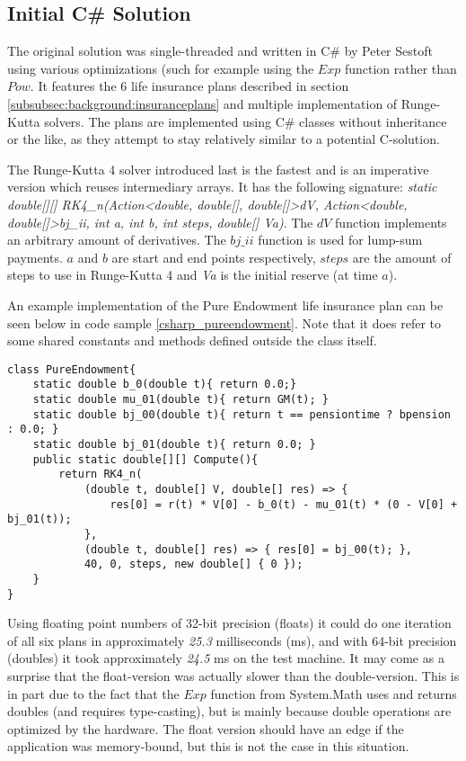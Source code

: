 \subsection{Initial C\# Solution}
The original solution was single-threaded and written in C\# by Peter Sestoft using various optimizations (such for example using the $Exp$ function rather than $Pow$.
It features the 6 life insurance plans described in section \ref{subsubsec:background:insuranceplans} and multiple implementation of Runge-Kutta solvers.
The plans are implemented using C\# classes without inheritance or the like, as they attempt to stay relatively similar to a potential C-solution.

The Runge-Kutta 4 solver introduced last is the fastest and is an imperative version which reuses intermediary arrays.
It has the following signature: \textit{static double[][] RK4\_n(Action\textless double, double[], double[]\textgreater  dV, Action\textless double, double[]\textgreater  bj\_ii, int a, int b, int steps, double[] Va)}.
The $dV$ function implements an arbitrary amount of derivatives.
The $bj\_ii$ function is used for lump-sum payments.
$a$ and $b$ are start and end points respectively, $steps$ are the amount of steps to use in Runge-Kutta 4 and \textit{Va} is the initial reserve (at time $a$).

An example implementation of the Pure Endowment life insurance plan can be seen below in code sample \ref{csharp_pureendowment}. 
Note that it does refer to some shared constants and methods defined outside the class itself.

\begin{lstlisting}[caption=The pure endowment insurance plan expressed in C\#, label=csharp_pureendowment]
class PureEndowment{
    static double b_0(double t){ return 0.0;}
    static double mu_01(double t){ return GM(t); }
    static double bj_00(double t){ return t == pensiontime ? bpension : 0.0; }
    static double bj_01(double t){ return 0.0; }
    public static double[][] Compute(){
        return RK4_n(
            (double t, double[] V, double[] res) => { 
                res[0] = r(t) * V[0] - b_0(t) - mu_01(t) * (0 - V[0] + bj_01(t)); 
            },
            (double t, double[] res) => { res[0] = bj_00(t); },
            40, 0, steps, new double[] { 0 });
    }
}
\end{lstlisting}

Using floating point numbers of 32-bit precision (floats) it could do one iteration of all six plans in approximately \emph{25.3} milliseconds (ms), and with 64-bit precision (doubles) it took approximately \emph{24.5} ms on the test machine.
It may come as a surprise that the float-version was actually slower than the double-version.
This is in part due to the fact that the $Exp$ function from System.Math uses and returns doubles (and requires type-casting), but is mainly because double operations are optimized by the hardware\cite{northrup2008mcts}.
The float version should have an edge if the application was memory-bound, but this is not the case in this situation.